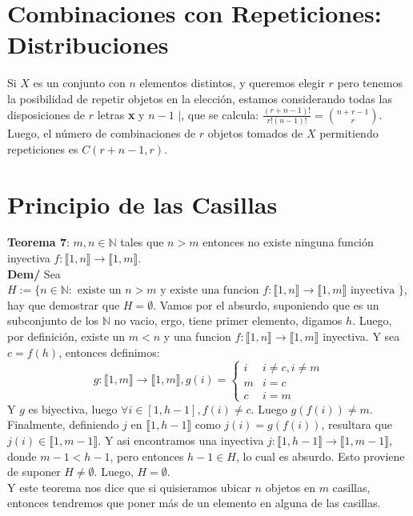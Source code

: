 \documentclass[11pt,a4paper]{article}
\begin{document}
\section{Combinaciones con Repeticiones: Distribuciones}
Si $X$ es un conjunto con $n$ elementos distintos, y queremos elegir $r$ pero tenemos la posibilidad de repetir objetos en la elección, estamos considerando todas las disposiciones de $r$ letras \textbf{x} y $n - 1$ $|$, que se calcula: $\frac{(r+n-1)!}{r!(n-1)!} = {n+r-1 \choose r}$. Luego, el número de combinaciones de $r$ objetos tomados de $X$ permitiendo repeticiones es $C(r + n - 1, r)$.\\

\section{Principio de las Casillas}
\textbf{Teorema 7}: $m,n \in \mathbb{N}$ tales que $n > m$ entonces no existe ninguna funci\'on inyectiva $f : \llbracket 1,n \rrbracket \rightarrow \llbracket 1,m \rrbracket$.\\
\textbf{Dem/} Sea $H := \{n \in \mathbb{N} : \text{ existe un $n > m$ y existe una funcion $f : \llbracket 1,n \rrbracket \rightarrow \llbracket 1,m \rrbracket$ inyectiva }\}$, hay que demostrar que $H = \emptyset$. Vamos por el absurdo, suponiendo que es un subconjunto de los $\mathbb{N}$ no vacio, ergo, tiene primer elemento, digamos $h$. Luego, por definici\'on, existe un $m < n$ y una funcion $f : \llbracket 1,n \rrbracket \rightarrow \llbracket 1,m \rrbracket$ inyectiva. Y sea $c = f(h)$, entonces definimos:
$$g: \llbracket 1,m \rrbracket \rightarrow \llbracket 1,m \rrbracket, g(i) = \left\{ 
\begin{array}{ll}
i & i \not = c, i \not = m \\
m & i = c\\
c & i = m
\end{array}
\right.$$
Y $g$ es biyectiva, luego $\forall i \in [1, h-1], f(i) \not = c$. Luego $g(f(i)) \not = m$. Finalmente, definiendo $j$ en $\llbracket 1,h-1 \rrbracket$ como $j(i) = g(f(i))$, resultara que $j(i) \in \llbracket 1, m-1 \rrbracket$. Y asi encontramos una inyectiva $j : \llbracket 1, h-1 \rrbracket \rightarrow \llbracket 1, m-1 \rrbracket$, donde $m-1 < h-1$, pero entonces $h-1 \in H$, lo cual es absurdo. Esto proviene de suponer $H \not = \emptyset$. Luego, $H = \emptyset$.\\

Y este teorema nos dice que si quisieramos ubicar $n$ objetos en $m$ casillas, entonces tendremos que poner m\'as de un elemento en alguna de las casillas.
\end{document}
